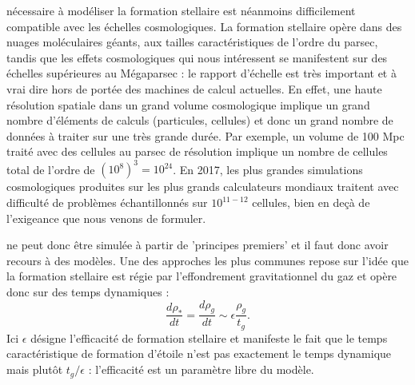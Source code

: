  nécessaire à modéliser la formation stellaire est néanmoins difficilement compatible avec les échelles cosmologiques. La formation stellaire opère dans des nuages moléculaires géants, aux tailles caractéristiques de l'ordre du parsec, tandis que les effets cosmologiques qui nous intéressent se manifestent sur des échelles supérieures au Mégaparsec : le rapport d'échelle est très important et à vrai dire hors de portée des machines de calcul actuelles. En effet, une haute résolution spatiale dans un grand volume cosmologique implique un grand nombre d'éléments de calculs (particules, cellules) et donc un grand nombre de données à traiter sur une très grande durée. Par exemple, un volume de 100 Mpc traité avec des cellules au parsec de résolution implique un nombre de cellules total de l'ordre de $(10^8)^3=10^{24}$. En 2017, les plus grandes simulations cosmologiques produites sur les plus grands calculateurs mondiaux traitent avec difficulté de problèmes échantillonnés sur $10^{11-12}$ cellules, bien en deçà de l'exigeance que nous venons de formuler.

 ne peut donc être simulée à partir de 'principes premiers' et il faut donc avoir recours à des modèles. Une des approches les plus communes repose sur l'idée que la formation stellaire est régie par l'effondrement gravitationnel du gaz et opère donc sur des temps dynamiques :
\begin{equation}
\frac{d \rho_*}{dt}=\frac{d \rho_g}{dt}\sim\epsilon\frac{\rho_g}{t_g}.
\end{equation}
Ici $\epsilon$ désigne l'efficacité de formation stellaire et manifeste le fait que le temps caractéristique de formation d'étoile n'est pas exactement le temps dynamique mais plutôt $t_g/\epsilon$ : l'efficacité est un paramètre libre du modèle.

